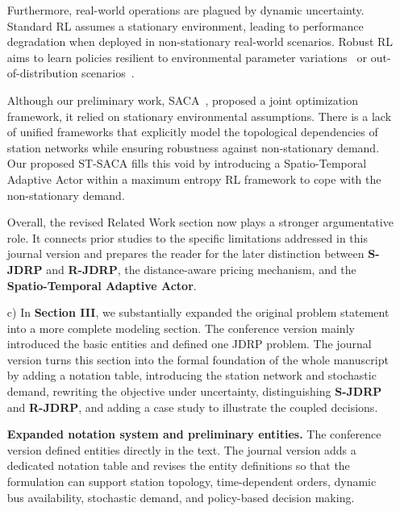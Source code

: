 \documentclass[11pt, a4paper]{article}
\begin{document}
\begin{itemize}
\begin{boxedminipage}[htbp]{\linewidth}
    Furthermore, real-world operations are plagued by dynamic uncertainty. Standard RL assumes a stationary environment, leading to performance degradation when deployed in non-stationary real-world scenarios. Robust RL aims to learn policies resilient to environmental parameter variations~\cite{ref:RobustRoute, ref:RobustMARL} or out-of-distribution scenarios~\cite{ref:Yoon2024IJCAI}.

    Although our preliminary work, SACA~\cite{ref:saca}, proposed a joint optimization framework, it relied on stationary environmental assumptions. There is a lack of unified frameworks that explicitly model the topological dependencies of station networks while ensuring robustness against non-stationary demand. Our proposed ST-SACA fills this void by introducing a Spatio-Temporal Adaptive Actor within a maximum entropy RL framework to cope with the non-stationary demand.
    \vspace{2mm}
    \end{boxedminipage}

    Overall, the revised Related Work section now plays a stronger argumentative role. It connects prior studies to the specific limitations addressed in this journal version and prepares the reader for the later distinction between \textbf{S-JDRP} and \textbf{R-JDRP}, the distance-aware pricing mechanism, and the \textbf{Spatio-Temporal Adaptive Actor}.

    \item[c)] In \textbf{Section III}, we substantially expanded the original problem statement into a more complete modeling section. The conference version mainly introduced the basic entities and defined one JDRP problem. The journal version turns this section into the formal foundation of the whole manuscript by adding a notation table, introducing the station network and stochastic demand, rewriting the objective under uncertainty, distinguishing \textbf{S-JDRP} and \textbf{R-JDRP}, and adding a case study to illustrate the coupled decisions.

    \textbf{Expanded notation system and preliminary entities.} The conference version defined entities directly in the text. The journal version adds a dedicated notation table and revises the entity definitions so that the formulation can support station topology, time-dependent orders, dynamic bus availability, stochastic demand, and policy-based decision making.


\end{itemize}
\end{document}
